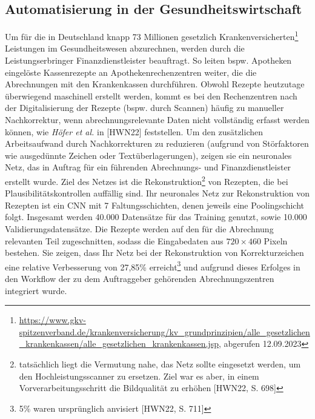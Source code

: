 \subsection{Automatisierung in der Gesundheitswirtschaft}
Um für die in Deutschland knapp 73 Millionen gesetzlich Krankenversicherten\footnote{
    \url{https://www.gkv-spitzenverband.de/krankenversicherung/kv_grundprinzipien/alle_gesetzlichen_krankenkassen/alle_gesetzlichen_krankenkassen.jsp}, abgerufen 12.09.2023
} Leistungen im Gesundheitswesen abzurechnen, werden durch die Leistungserbringer Finanzdienstleister beauftragt. So leiten bspw. Apotheken eingelöste Kassenrezepte an Apothekenrechenzentren weiter, die die Abrechnungen mit den Krankenkassen durchführen. Obwohl Rezepte heutzutage überwiegend maschinell erstellt werden, kommt es bei den Rechenzentren nach der Digitalisierung der Rezepte (bspw. durch Scannen) häufig zu manueller Nachkorrektur, wenn abrechnungsrelevante Daten nicht vollständig erfasst werden können, wie \textit{Höfer et al.} in [HWN22] feststellen. Um den zusätzlichen Arbeitsaufwand durch Nachkorrekturen zu reduzieren (aufgrund von Störfaktoren wie ausgedünnte Zeichen oder Textüberlagerungen), zeigen sie ein neuronales Netz, das in Auftrag für ein führenden Abrechnungs- und Finanzdienstleister erstellt wurde. Ziel des Netzes ist die Rekonstruktion\footnote{
    tatsächlich liegt die Vermutung nahe, das Netz sollte eingesetzt werden, um den Hochleistungsscanner zu ersetzen. Ziel war es aber, in einem Vorverarbeitungsschritt die Bildqualität zu erhöhen [HWN22, S. 698]
} von Rezepten, die bei Plausibilitätskontrollen auffällig sind.
Ihr neuronales Netz zur Rekonstruktion von Rezepten ist ein CNN mit 7 Faltungsschichten, denen jeweils eine Poolingschicht folgt. Insgesamt werden 40.000 Datensätze für das Training genutzt, sowie 10.000 Validierungsdatensätze. Die Rezepte werden auf den für die Abrechnung relevanten Teil zugeschnitten, sodass die Eingabedaten aus $720 \times 460$ Pixeln bestehen. Sie zeigen, dass Ihr Netz bei der Rekonstruktion von Korrekturzeichen eine relative Verbesserung von 27,85\% erreicht\footnote{
    5\% waren ursprünglich anvisiert [HWN22, S. 711]
} und aufgrund dieses Erfolges in den  Workflow der zu dem Auftraggeber gehörenden Abrechnungszentren integriert wurde.


